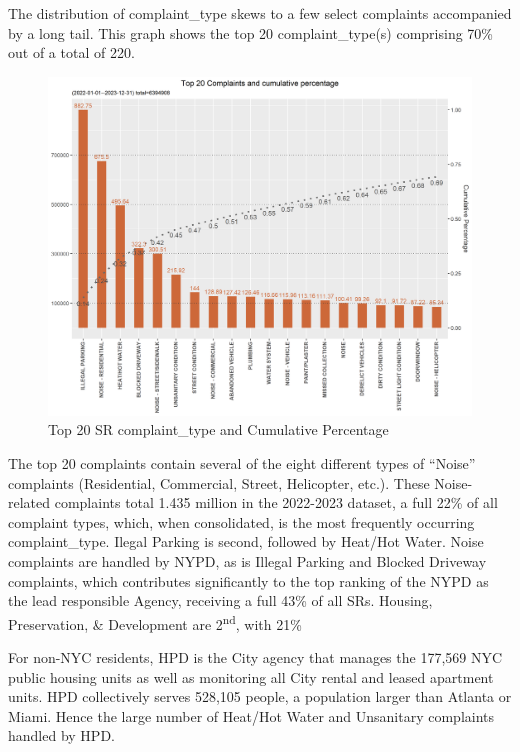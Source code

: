 \documentclass[12pt, titlepage]{article}
\begin{document}
The distribution of complaint\_type skews to a few select complaints accompanied by a long tail.
This graph shows the top 20 complaint\_type(s) comprising 70\% out of a total of 220.

\begin{figure}[H]
  \centering
	  \includegraphics[width=\textwidth]{SRs_by_Complaint_Type.png}
	  \caption{Top 20 SR complaint\_type and Cumulative Percentage}
	  \label{fig:SR_complaints}
\end{figure}

The top 20 complaints contain several of the eight different types of ``Noise'' complaints (Residential, Commercial, Street, Helicopter, etc.). These Noise-related
complaints total 1.435 million in the 2022-2023 dataset, a full 22\% of all complaint types, which, when consolidated, is the most frequently occurring complaint\_type.
Ilegal Parking is second, followed by Heat/Hot Water. Noise complaints are handled by NYPD, as is Illegal Parking and Blocked Driveway complaints, which contributes
significantly to the top ranking of the NYPD as the lead responsible Agency, receiving a full 43\% of all SRs. 
Housing, Preservation, \& Development are 2\textsuperscript{nd}, with 21\%

For  non-NYC residents, HPD is the City agency that manages the 177,569 NYC public housing units as well as monitoring
all City rental and leased apartment units. HPD collectively serves 528,105 people, a population larger than Atlanta or Miami. 
Hence the large number of Heat/Hot Water and Unsanitary complaints handled by HPD. 
\end{document}
